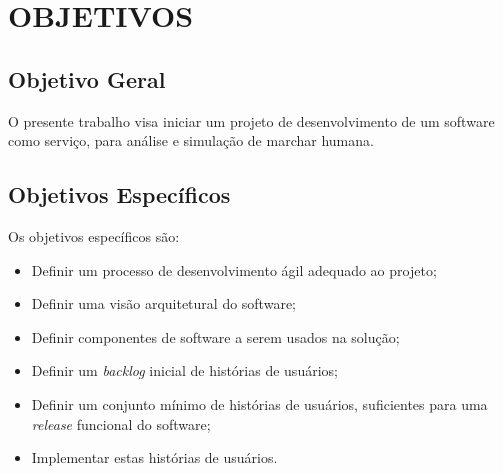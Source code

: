 \section[OBJETIVOS]{OBJETIVOS}

\subsection[Objetivo Geral]{\textbf{Objetivo Geral}}
O presente trabalho visa iniciar um projeto de desenvolvimento de um software como serviço, para análise e simulação de marchar humana.

\subsection[Objetivo Específicos]{\textbf{Objetivos Específicos}}
Os objetivos específicos são:
\begin{itemize}
	\item Definir um processo de desenvolvimento ágil adequado ao projeto;
	\item Definir uma visão arquitetural do software;
	\item Definir componentes de software a serem usados na solução;
	\item Definir um \emph{backlog} inicial de histórias de usuários;
	\item Definir um conjunto mínimo de histórias de usuários, suficientes para uma \emph{release} funcional do software;
	\item Implementar estas histórias de usuários.
\end{itemize}
